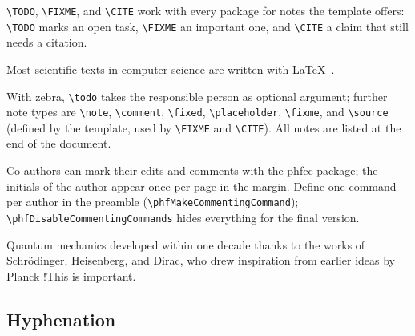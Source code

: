 \begin{ltgexample}
\end{ltgexample}

\verb|\TODO|, \verb|\FIXME|, and \verb|\CITE| work with every package for notes the template offers: \verb|\TODO| marks an open task, \verb|\FIXME| an important one, and \verb|\CITE| a claim that still needs a citation.

\begin{ltgexample}


Most scientific texts in computer science are written with \LaTeX{}~.
\end{ltgexample}

With zebra, \verb|\todo| takes the responsible person as optional argument; further note types are \verb|\note|, \verb|\comment|, \verb|\fixed|, \verb|\placeholder|, \verb|\fixme|, and \verb|\source| (defined by the template, used by \verb|\FIXME| and \verb|\CITE|).
All notes are listed at the end of the document.

\begin{ltgexample}




\end{ltgexample}


Co-authors can mark their edits and comments with the \href{https://ctan.org/pkg/phfcc}{phfcc} package; the initials of the author appear once per page in the margin.
Define one command per author in the preamble (\verb|\phfMakeCommentingCommand|); \verb|\phfDisableCommentingCommands| hides everything for the final version.

\begin{ltgexample}
Quantum mechanics developed within one decade thanks to the works of Schrödinger, Heisenberg, and Dirac,
who drew inspiration from earlier ideas by Planck  
 \FA!{This is important.}
\end{ltgexample}

\subsection{Hyphenation}


